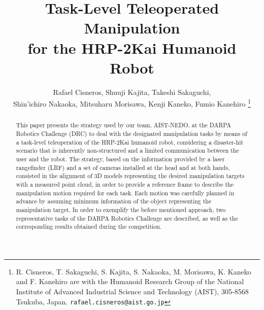 \documentclass[letterpaper, 10 pt, conference]{ieeeconf}
\begin{document}
	\title{\LARGE \bf Task-Level Teleoperated Manipulation \\ for the HRP-2Kai Humanoid Robot}

	\author{Rafael Cisneros, Shuuji Kajita, Takeshi Sakaguchi, \\
					Shin'ichiro Nakaoka, Mitsuharu Morisawa, Kenji Kaneko, Fumio Kanehiro
	\thanks{R. Cisneros, T. Sakaguchi, S. Kajita, S. Nakaoka, M. Morisawa, K. Kaneko and F. Kanehiro
					are with the Humanoid Research Group of the National Institute of Advanced Industrial Science
					and Technology (AIST), 305-8568 Tsukuba, Japan. {\tt\small rafael.cisneros@aist.go.jp}}}
  
	\maketitle

	\thispagestyle{empty}
	\pagestyle{empty}

	\begin{abstract}
		This paper presents the strategy used by our team, AIST-NEDO, at the DARPA Robotics Challenge (DRC) to deal
		with the designated manipulation tasks by means of a task-level teleoperation of the HRP-2Kai humanoid robot,
		considering a disaster-hit scenario that is inherently non-structured and a limited communication between the
		user and the robot.
		The strategy, based on the information provided by a laser rangefinder (LRF) and a set of cameras installed
		at the head and at both hands, consisted in the alignment of 3D models representing the desired manipulation
		targets with a measured point cloud, in order to provide a reference frame to describe the manipulation motion
		required for each task.
		Each motion was carefully planned in advance by assuming minimum information of the object representing the
		manipulation target.
		In order to exemplify the before mentioned approach, two representative tasks of the DARPA Robotics Challenge
		are described, as well as the corresponding results obtained during the competition.
	\end{abstract}

	
	
		
	
	
	
	
		
	
		
	
	
	
	
	
	
	
	
\end{document}
